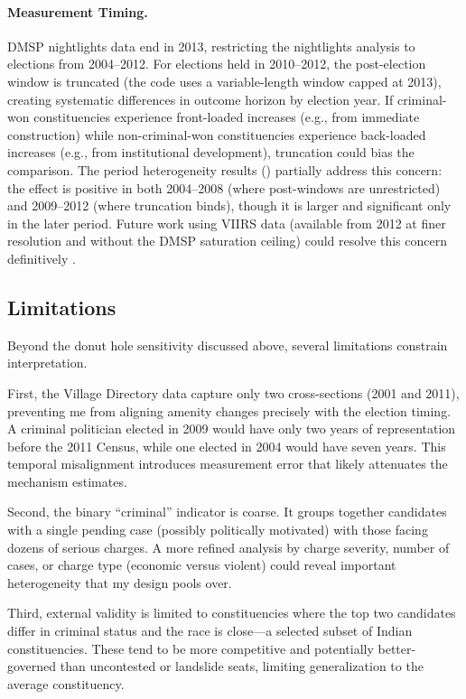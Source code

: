 \documentclass[12pt]{article}
\begin{document}
\paragraph{Measurement Timing.} DMSP nightlights data end in 2013, restricting the nightlights analysis to elections from 2004--2012. For elections held in 2010--2012, the post-election window is truncated (the code uses a variable-length window capped at 2013), creating systematic differences in outcome horizon by election year. If criminal-won constituencies experience front-loaded increases (e.g., from immediate construction) while non-criminal-won constituencies experience back-loaded increases (e.g., from institutional development), truncation could bias the comparison. The period heterogeneity results () partially address this concern: the effect is positive in both 2004--2008 (where post-windows are unrestricted) and 2009--2012 (where truncation binds), though it is larger and significant only in the later period. Future work using VIIRS data (available from 2012 at finer resolution and without the DMSP saturation ceiling) could resolve this concern definitively \citep{ChenNordhaus2011}.

\subsection{Limitations}

Beyond the donut hole sensitivity discussed above, several limitations constrain interpretation.

First, the Village Directory data capture only two cross-sections (2001 and 2011), preventing me from aligning amenity changes precisely with the election timing. A criminal politician elected in 2009 would have only two years of representation before the 2011 Census, while one elected in 2004 would have seven years. This temporal misalignment introduces measurement error that likely attenuates the mechanism estimates.

Second, the binary ``criminal'' indicator is coarse. It groups together candidates with a single pending case (possibly politically motivated) with those facing dozens of serious charges. A more refined analysis by charge severity, number of cases, or charge type (economic versus violent) could reveal important heterogeneity that my design pools over.

Third, external validity is limited to constituencies where the top two candidates differ in criminal status and the race is close---a selected subset of Indian constituencies. These tend to be more competitive and potentially better-governed than uncontested or landslide seats, limiting generalization to the average constituency.
\end{document}

